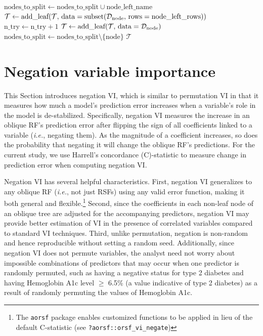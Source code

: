 \documentclass{article}\usepackage[]{graphicx}\usepackage[]{xcolor}
\newcommand{\dataset}{{\cal D}}
\newcommand{\ie}{\textit{i.e.}}
\begin{document}
\begin{algorithm}
\begin{algorithmic}[1]
           \State $\text{nodes\_to\_split} \gets \text{nodes\_to\_split} \cup \text{node\_left\_name}$
         \Else
           \State $\mathcal{T} \gets \text{add\_leaf}(\mathcal{T},\, \text{data} = \text{subset}(\dataset_{\text{node}},\,\text{rows} = \text{node\_left\_rows}))$
         \EndIf
         \State $\text{n\_try} \gets \text{n\_try} + 1$
         \State {}
       \Else
         \State $\mathcal{T} \gets \text{add\_leaf}(\mathcal{T},\, \text{data} =\dataset_{\text{node}})$
       \EndIf
       \State $\text{nodes\_to\_split} \gets \text{nodes\_to\_split} \setminus \{\text{node}\}$
     \EndFor
  \EndWhile
  \State \Return $\mathcal{T}$
  \end{algorithmic}
\end{algorithm}

\section{Negation variable importance} \label{sec:negation_vi}

This Section introduces negation VI, which is similar to permutation VI in that it measures how much a model’s prediction error increases when a variable’s role in the model is de-stabilized. Specifically, negation VI measures the increase in an oblique RF's prediction error after flipping the sign of all coefficients linked to a variable (\ie, negating them). As the magnitude of a coefficient increases, so does the probability that negating it will change the oblique RF's predictions. For the current study, we use Harrell's concordance (C)-statistic \citep{harrell1982evaluating} to measure change in prediction error when computing negation VI.

Negation VI has several helpful characteristics. First, negation VI generalizes to any oblique RF (\ie, not just RSFs) using any valid error function, making it both general and flexible.\footnote{The \texttt{aorsf} package enables customized functions to be applied in lieu of the default C-statistic (see \texttt{?aorsf::orsf\_vi\_negate})} Second, since the coefficients in each non-leaf node of an oblique tree are adjusted for the accompanying predictors, negation VI may provide better estimation of VI in the presence of correlated variables compared to standard VI techniques. Third, unlike permutation, negation is non-random and hence reproducible without setting a random seed. Additionally, since negation VI does not permute variables, the analyst need not worry about impossible combinations of predictors that may occur when one predictor is randomly permuted, such as having a negative status for type 2 diabetes and having Hemoglobin A1c level $\geq$ 6.5\% (a value indicative of type 2 diabetes) as a result of randomly permuting the values of Hemoglobin A1c.
\end{document}
